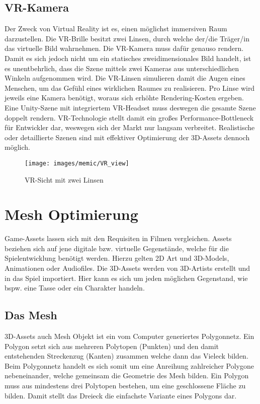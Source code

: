\subsection{VR-Kamera}

Der Zweck von Virtual Reality ist es, einen möglichst immersiven Raum darzustellen. Die VR-Brille besitzt zwei Linsen, durch welche der/die Träger/in das virtuelle Bild wahrnehmen. Die VR-Kamera muss dafür genauso rendern. Damit es sich jedoch nicht um ein statisches zweidimensionales Bild handelt, ist es unentbehrlich, dass die Szene mittels zwei Kameras aus unterschiedlichen Winkeln aufgenommen wird. Die VR-Linsen simulieren damit die Augen eines Menschen, um das Gefühl eines wirklichen Raumes zu realisieren. Pro Linse wird jeweils eine Kamera benötigt, woraus sich erhöhte Rendering-Kosten ergeben. Eine Unity-Szene mit integriertem VR-Headset muss deswegen die gesamte Szene doppelt rendern. VR-Technologie stellt damit ein großes Performance-Bottleneck für Entwickler dar, weswegen sich der Markt nur langsam verbreitet. Realistische oder detaillierte Szenen sind mit effektiver Optimierung der 3D-Assets dennoch möglich.
\begin{figure}[H]
	\centering
	\texttt{[image: images/memic/VR\_view]}
	\caption{VR-Sicht mit zwei Linsen}
\end{figure}
\cite{_vrview}

\section{Mesh Optimierung}

Game-Assets lassen sich mit den Requisiten in Filmen vergleichen. Assets beziehen sich auf jene digitale bzw. virtuelle Gegenstände, welche für die Spielentwicklung benötigt werden. Hierzu gelten 2D Art und 3D-Models, Animationen oder Audiofiles. Die 3D-Assets werden von 3D-Artists erstellt und in das Spiel importiert. Hier kann es sich um jeden möglichen Gegenstand, wie bspw. eine Tasse oder ein Charakter handeln.\cite{_unity_game_optimization}

\subsection{Das Mesh}

3D-Assets auch Mesh Objekt ist ein vom Computer generiertes Polygonnetz. Ein Polygon setzt sich aus mehreren Polytopen (Punkten) und den damit entstehenden Streckenzug (Kanten) zusammen welche dann das Vieleck bilden. Beim Polygonnetz handelt es sich somit um eine Anreihung zahlreicher Polygone nebeneinander, welche gemeinsam die Geometrie des Mesh bilden. Ein Polygon muss aus mindestens drei Polytopen bestehen, um eine geschlossene Fläche zu bilden. Damit stellt das Dreieck die einfachste Variante eines Polygons dar.\cite{_the_essential_guide_to_3D}

